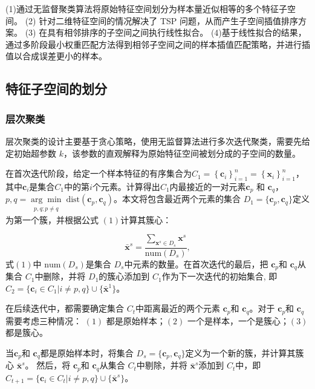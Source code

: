\documentclass[12pt,a4paper]{article}%
\begin{document}
	 (1)通过无监督聚类算法将原始特征空间划分为样本量近似相等的多个特征子空间。 (2) 针对二维特征空间的情况解决了 TSP 问题，从而产生子空间插值排序方案。 (3) 在具有相邻排序的子空间之间执行线性拟合。
	 (4)基于线性拟合的结果，通过多阶段最小权重匹配方法得到相邻子空间之间的样本插值匹配策略，并进行插值以合成误差更小的样本。

	\subsection{特征子空间的划分}
	\subsubsection{层次聚类}
	层次聚类的设计主要基于贪心策略，使用无监督算法进行多次迭代聚类，需要先给定初始超参数 $k$，该参数的直观解释为原始特征空间被划分成的子空间的数量。

	在首次迭代阶段，给定一个样本特征的有序集合为$C_1=\left\{\boldsymbol{c}_i \right\}_{i=1}^n=\left\{\boldsymbol{x }_i \right\}_{i=1}^n$，
	其中$\boldsymbol{c}_i$是集合$C_1$中的第$i$个元素。计算得出$C_1$内最接近的一对元素$\boldsymbol{c}_p$ 和 $\boldsymbol{c}_q$，
	$p,q = \underset{\substack{p, q; p \neq q}}{\arg\min} \;\text{dist}(\boldsymbol{c}_p, \boldsymbol{c}_q)$。本文将包含最近两个元素的集合
	$D_{1}=\{\boldsymbol{c}_p,\boldsymbol{c}_q\}$定义为第一个簇，并根据公式 $(1)$计算其簇心：

	\begin{equation} \label{equ1}
		\bar{\boldsymbol{x}}^s = \frac{\sum_{\boldsymbol{x}^s \in D_s} \boldsymbol{x}^s}{\text{num}(D_s)}, 
	\end{equation}
	式$(1)$中 $\text{num}(D_s)$是集合 $D_s$中元素的数量。在首次迭代的最后，把 $\boldsymbol{c}_p$和 $\boldsymbol{c}_q$从集合 $C_1$中删除，并将 $D_1$的簇心添加到 $C_1$作为下一次迭代的初始集合,
	即  $C_{2}=\{\boldsymbol{c}_i \in C_{1} | i \neq p, q\} \cup \{\bar{\boldsymbol{x}}^1\}$。

	在后续迭代中，都需要确定集合 $C_t$中距离最近的两个元素 $\boldsymbol{c}_p$和 $\boldsymbol{c}_q$。对于 $\boldsymbol{c}_p$和 $\boldsymbol{c}_q$需要考虑三种情况：
	$(1)$ 都是原始样本；$(2)$ 一个是样本，一个是簇心；$(3)$ 都是簇心。

	

	当$\boldsymbol{c}_p$和 $\boldsymbol{c}_q$都是原始样本时，将集合 $D_s=\{\boldsymbol{c}_p,\boldsymbol{c}_q\}$定义为一个新的簇，并计算其簇心 $\bar{\boldsymbol{x}}^s$。
	然后，将 $\boldsymbol{c}_p$和 $\boldsymbol{c}_q$从集合 $C_t$中剔除，并将 $\bar{\boldsymbol{x}}^s$添加到 $C_t$中，即 $C_{t+1}=\{\boldsymbol{c}_i \in C_{t} | i \neq p, q\} \cup \{\bar{\boldsymbol{x}}^s\}$。
	
\end{document}
